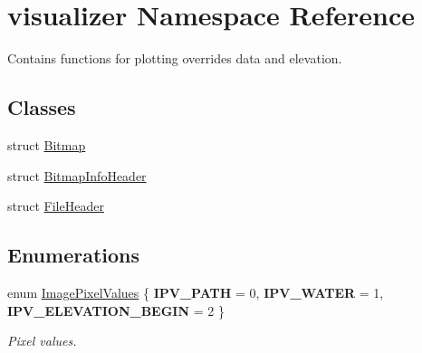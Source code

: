 \hypertarget{namespacevisualizer}{}\section{visualizer Namespace Reference}
\label{namespacevisualizer}


Contains functions for plotting overrides data and elevation.  


\subsection*{Classes}
\begin{DoxyCompactItemize}
\item 
struct \mbox{\hyperlink{structvisualizer_1_1_bitmap}{Bitmap}}
\item 
struct \mbox{\hyperlink{structvisualizer_1_1_bitmap_info_header}{Bitmap\+Info\+Header}}
\item 
struct \mbox{\hyperlink{structvisualizer_1_1_file_header}{File\+Header}}
\end{DoxyCompactItemize}
\subsection*{Enumerations}
\begin{DoxyCompactItemize}
\item 
\mbox{\label{namespacevisualizer_af36cea222d0362709a55b17474afcc8a}} 
enum \mbox{\hyperlink{namespacevisualizer_af36cea222d0362709a55b17474afcc8a}{Image\+Pixel\+Values}} \{ {\bfseries I\+P\+V\+\_\+\+P\+A\+TH} = 0, 
{\bfseries I\+P\+V\+\_\+\+W\+A\+T\+ER} = 1, 
{\bfseries I\+P\+V\+\_\+\+E\+L\+E\+V\+A\+T\+I\+O\+N\+\_\+\+B\+E\+G\+IN} = 2
 \}
\begin{DoxyCompactList}\small\item\em Pixel values. \end{DoxyCompactList}\end{DoxyCompactItemize}
